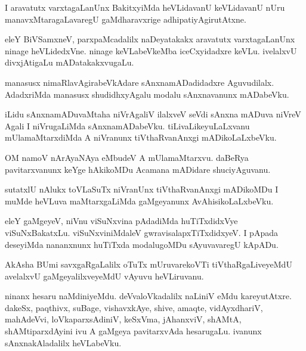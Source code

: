 \documentclass{article}
\begin{document}
\begin{mn}
I  aravatutx  varxtagaLanUnx  BakitxyiMda  heVLidavanU  keVLidavanU  nUru  
manavxMtaragaLavaregU  gaMdharavxrige  adhipatiyAgirutAtxne.
\end{mn}

\begin{mn}
eleY  BiVSamxneV,  parxpaMcadalilx  naDeyatakakx  aravatutx  varxtagaLanUnx  ninage  heVLidedxVne.  
ninage  keVLabeVkeMba  iceCxyidadxre  keVLu.  ivelalxvU  divxjAtigaLu  mADatakakxvugaLu.
\end{mn}

\begin{mn}
manasusx  nimaRlavAgirabeVkAdare  sAnxnamADadidadxre  Aguvudilalx.  AdadxriMda  
manasusx  shudidhxyAgalu  modalu  sAnxnavanunx  mADabeVku.
\end{mn}

\begin{mn}
iLidu  sAnxnamADuvaMtaha  niVrAgaliV  ilalxveV  seVdi  sAnxna mADuva  niVreV  Agali  
I  niVrugaLiMda  sAnxnamADabeVku.  tiLivaLikeyuLaLxvanu  mUlamaMtarxdiMda  A  
niVranunx  tiVthaRvanAnxgi  mADikoLaLxbeVku.
\end{mn}

\begin{mn}
OM  namoV  nArAyaNAya  eMbudeV  A  mUlamaMtarxvu.  daBeRya  pavitarxvanunx  keYge  
hAkikoMDu  Acamana  mADidare  shuciyAguvanu.
\end{mn}

\begin{mn}
sutatxlU  nAlukx  toVLaSuTx  niVranUnx  tiVthaRvanAnxgi  mADikoMDu  I  muMde  
heVLuva  maMtarxgaLiMda  gaMgeyanunx  AvAhisikoLaLxbeVku. 
\end{mn}

\begin{mn}
eleY  gaMgeyeV,  niVnu  viSuNxvina  pAdadiMda  huTiTxdidxVye  viSuNxBakatxLu.  
viSuNxviniMdaleV  gwravisalapxTiTxdidxyeV.  I  pApada  deseyiMda  nananxnunx  
huTiTxda  modalugoMDu  sAyuvavaregU  kApADu.
\end{mn}

\begin{mn}
AkAsha  BUmi  savxgaRgaLalilx  oTuTx  mUruvarekoVTi  tiVthaRgaLiveyeMdU  
avelalxvU  gaMgeyalilxveyeMdU  vAyuvu  heVLiruvanu.
\end{mn}

\begin{mn}
ninanx  hesaru  naMdiniyeMdu.  deVvaloVkadalilx  naLiniV  eMdu  kareyutAtxre.  dakeSx,  
paqthivx,  suBage,  vishavxkAye,  shive,  amaqte,  vidAyxdhariV,  mahAdeVvi,  
loVkaparxsAdiniV,  keSxVma,  jAhanxviV,  shAMtA,  shAMtiparxdAyini  ivu  
A gaMgeya  pavitarxvAda  hesarugaLu.  ivanunx  sAnxnakAladalilx  heVLabeVku.
\end{mn}
\end{document}
